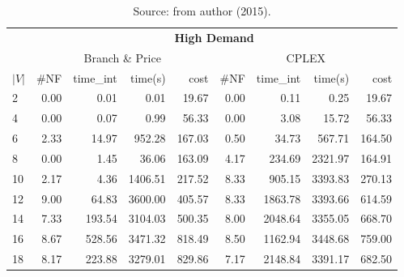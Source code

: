 \begin{table*}[h]
\begin{center}
\begin{tabular} {l | r r r r | r r r r }
\hline
       & \multicolumn{8}{c}{ \textbf{High Demand}} \\
       &       \multicolumn{4}{c|}{Branch \& Price} & \multicolumn{4}{c}{CPLEX}               \\  
$|V|$  & \#NF &  time\_int    &  time(s)       &  cost          &  \#NF &  time\_int  &  time(s)       &  cost \\
\hline      
2&    0.00 & 0.01 & 0.01 & 19.67 & 0.00 & 0.11 & 0.25 & 19.67                  \\  
4&    0.00 & 0.07 & 0.99 & 56.33 & 0.00 & 3.08 & 15.72 & 56.33                 \\
6&    2.33 & 14.97 & 952.28 & 167.03 & 0.50 & 34.73 & 567.71 & 164.50          \\
8&    0.00 & 1.45 & 36.06 & 163.09 & 4.17 & 234.69 & 2321.97 & 164.91          \\
10&   2.17 & 4.36 & 1406.51 & 217.52 & 8.33 & 905.15 & 3393.83 & 270.13        \\
12&   9.00 & 64.83 & 3600.00 & 405.57 & 8.33 & 1863.78 & 3393.66 & 614.59      \\
14&   7.33 & 193.54 & 3104.03 & 500.35 & 8.00 & 2048.64 & 3355.05 & 668.70     \\
16&   8.67 & 528.56 & 3471.32 & 818.49 & 8.50 & 1162.94 & 3448.68 & 759.00     \\
18&   8.17 & 223.88 & 3279.01 & 829.86 & 7.17 & 2148.84 & 3391.17 & 682.50     \\ 
\hline
\end{tabular}\caption*{Source: from author (2015).} 
\end{center}
\end{table*}




